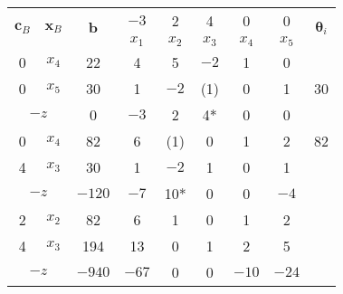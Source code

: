 \begin{enumerate}[label=\alph*)]
        \begin{table}[ht]
            \centering
            \caption{}
            \label{table:9b}
            \begin{tabular}{|c|c|c|c|c|c|c|c|c|}
                \hline
                \multirow{2}{*}{$\bm{c}_B$} & \multirow{2}{*}{$\bm{x}_B$} & \multirow{2}{*}{$\bm{b}$} & \multicolumn{1}{c}{$-3$} & \multicolumn{1}{c}{2} & \multicolumn{1}{c}{4} & \multicolumn{1}{c}{0} & 0 & \multirow{2}{*}{$\bm{\theta}_i$} \\
                \cline{4-8}
                &&& \multicolumn{1}{c}{$x_1$} & \multicolumn{1}{c}{$x_2$} & \multicolumn{1}{c}{$x_3$} & \multicolumn{1}{c}{$x_4$} & $x_5$ & \\
                \hline
                0 & $x_4$ & 22 & \multicolumn{1}{c}{4} & \multicolumn{1}{c}{5} & \multicolumn{1}{c}{\cellcolor{LightBlue1}$-2$} & \multicolumn{1}{c}{1} & 0 & \\
                \cline{1-3}
                0 & {\color{red}$x_5$} & 30 & \multicolumn{1}{c}{1} & \multicolumn{1}{c}{$-2$} & \multicolumn{1}{c}{\cellcolor{LightBlue1}\color{red}(1)} & \multicolumn{1}{c}{0} & 1 & {\color{red}30} \\
                \hline
                \multicolumn{2}{|c|}{$-z$} & 0 & \multicolumn{1}{c}{$-3$} & \multicolumn{1}{c}{2} & \multicolumn{1}{c}{\cellcolor{LightBlue1}\color{red}4*} & \multicolumn{1}{c}{0} & 0 & \\

                \hline

                0 & {\color{red}$x_4$} & 82 & \multicolumn{1}{c}{6} & \multicolumn{1}{c}{\cellcolor{LightBlue1}\color{red}(1)} & \multicolumn{1}{c}{0} & \multicolumn{1}{c}{1} & 2 & {\color{red}82} \\
                \cline{1-3}
                4 & $x_3$ & 30 & \multicolumn{1}{c}{1} & \multicolumn{1}{c}{\cellcolor{LightBlue1}$-2$} & \multicolumn{1}{c}{1} & \multicolumn{1}{c}{0} & 1 & \\
                \hline
                \multicolumn{2}{|c|}{$-z$} & $-120$ & \multicolumn{1}{c}{$-7$} & \multicolumn{1}{c}{\cellcolor{LightBlue1}\color{red}10*} & \multicolumn{1}{c}{0} & \multicolumn{1}{c}{0} & $-4$ & \\

                \hline

                2 & $x_2$ & 82 & \multicolumn{1}{c}{6} & \multicolumn{1}{c}{1} & \multicolumn{1}{c}{0} & \multicolumn{1}{c}{1} & 2 & \\
                \cline{1-3}
                4 & $x_3$ & 194 & \multicolumn{1}{c}{13} & \multicolumn{1}{c}{0} & \multicolumn{1}{c}{1} & \multicolumn{1}{c}{2} & 5 & \\
                \hline
                \multicolumn{2}{|c|}{$-z$} & $-940$ & \multicolumn{1}{c}{$-67$} & \multicolumn{1}{c}{0} & \multicolumn{1}{c}{0} & \multicolumn{1}{c}{$-10$} & $-24$ & \\


\end{tabular}
\end{table}
\end{enumerate}
